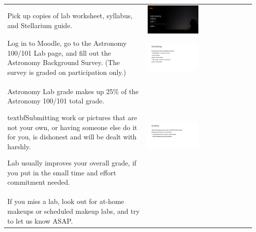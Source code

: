 \documentclass[12pt]{article}
\begin{document}
\begin{longtable}{m{}m{}}
Pick up copies of lab worksheet, syllabus, and Stellarium guide. & \includegraphics[width=0.5\textwidth]{ppt/lab01/Slide1.jpeg}\\
Log in to Moodle, go to the Astronomy 100/101 Lab page, and fill out the Astronomy Background Survey. (The survey is graded on participation only.) & \includegraphics[width=0.5\textwidth]{ppt/lab01/Slide3.jpeg}\\
Astronomy Lab grade makes up 25\% of the Astronomy 100/101 total grade.

textbf{Submitting work or pictures that are not your own, or having someone else do it for you, is dishonest and will be dealt with harshly.}

Lab usually improves your overall grade, if you put in the small time and effort commitment needed. & \includegraphics[width=0.5\textwidth]{ppt/lab01/Slide5.jpeg}\\
If you miss a lab, look out for at-home makeups or scheduled makeup labs, and try to let us know ASAP.


\end{longtable}
\end{document}
